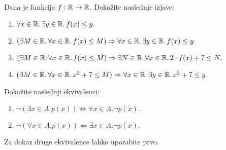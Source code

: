 \begin{vaja}
  Dana je funkcija $f : \mathbb{R} \to \mathbb{R}$. Dokažite naslednje izjave:
  \begin{enumerate}
  \item  $\forall x \in \mathbb{R} .\, \exists y \in \mathbb{R} .\, f(x) \leq y.$
  \item$(\exists M \in \mathbb{R} .\, \forall x \in \mathbb{R} .\, f(x) \leq M) \Rightarrow \forall x \in \mathbb{R} .\, \exists y \in \mathbb{R} .\, f(x) \leq y.$
  \item $(\exists M \in \mathbb{R} .\, \forall x \in \mathbb{R} .\, f(x) \leq M) \Rightarrow \exists N \in \mathbb{R} .\, \forall x \in \mathbb{R} .\, 2 \cdot f(x) + 7 \leq N.$
  \item $(\exists M \in \mathbb{R} .\, \forall x \in \mathbb{R} .\, x^2 + 7 \leq M) \Rightarrow \forall x \in \mathbb{R} .\, \exists y \in \mathbb{R} .\, x^2 + 7 \leq y$.
  \end{enumerate}
\end{vaja}

\begin{vaja}
  Dokažite naslednji ekvivalenci:
  \begin{enumerate}
  \item  %
    $\lnot (\exists x \in A . p(x))
    \iff
    \forall x \in A . \lnot p(x).$
  \item
  $
    \lnot (\forall x \in A . p(x))
    \iff
    \exists x \in A . \lnot p(x).
  $
  \end{enumerate}
  Za dokaz druge ekvivalence lahko uporabite prvo.
\end{vaja}



